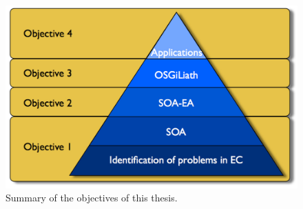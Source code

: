\begin{figure}
\centering
 \includegraphics[scale =0.3] {gfx/intro/tesispiramide.pdf}
\caption{Summary of the objectives of this thesis.}
\label{fig:intro:piramid}
\end{figure}

